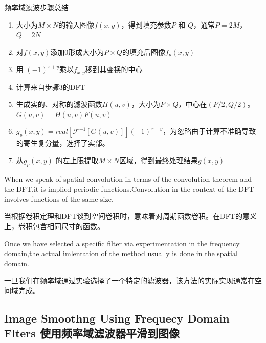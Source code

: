 \documentclass[12pt]{article}
\numberwithin{equation}{section}%
\begin{document}
\begin{description}
\item [频率域滤波步骤总结]
\end{description}

\begin{enumerate}
\item 大小为$M\times N$的输入图像$f(x,y)$，得到填充参数$P$ 和 $Q$，通常$P=2M$，$Q=2N$  

\item 对$f(x,y)$添加0形成大小为$P\times Q$的填充后图像$f_{p}(x,y)$

\item 用 $(-1)^{x+y}$乘以$f_{x,y}$移到其变换的中心

\item 计算来自步骤3的DFT

\item 生成实的、对称的滤波函数$H(u,v)$，大小为$P\times Q$，中心在$(P/2,Q/2)$。$G(u,v)=H(u,v)F(u,v)$

\item $g_{p}(x,y)={real[\mathscr{F}^{-1}[G(u,v)]]}(-1)^{x+y}$，为忽略由于计算不准确导致的寄生复分量，选择了实部。

\item 从$g_{p}(x,y)$ 的左上限提取$M\times N$区域，得到最终处理结果$g(x,y)$

\end{enumerate}

When we speak of spatial convolution in terms of the convolution theorem and the DFT,it is implied periodic functions.Convolution in the context of the DFT involves functions of the same size.

当根据卷积定理和DFT谈到空间卷积时，意味着对周期函数卷积。在DFT的意义上，卷积包含相同尺寸的函数。

Once we have selected a specific filter via experimentation in the frequency domain,the actual imlentation of the method usually is done in the spatial domain.

一旦我们在频率域通过实验选择了一个特定的滤波器，该方法的实际实现通常在空间域完成。

\subsection{Image Smoothng Using Frequecy Domain Flters 使用频率域滤波器平滑到图像}

 

 





\end{document}
